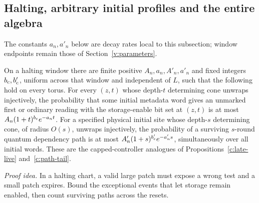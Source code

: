 \subsection{Halting, arbitrary initial profiles and the entire algebra}\label{v:forgetting}
The constants \(a_n,a'_n\) below are decay rates local to this
subsection; window endpoints remain those of Section~\ref{v:parameters}.
\begin{lemma}\label{v:ancestor}
On a halting window there are finite positive \(A_n,a_n,A'_n,a'_n\) and
fixed integers \(b_{\rm c},b'_{\rm c}\), uniform across that window and
independent of \(L\), such that the following hold on every torus. For
every \((z,t)\) whose depth-\(t\) determining cone unwraps injectively,
the probability that some initial metadata word gives an unmarked
first or ordinary reading with the storage-enable bit set at \((z,t)\) is at most
\(A_n(1+t)^{b_{\rm c}}e^{-a_nt}\). For a specified physical initial site
whose depth-\(s\) determining cone, of radius \(O(s)\), unwraps
injectively, the probability of a surviving \(s\)-round quantum dependency
path is at most \(A'_n(1+s)^{b'_{\rm c}}e^{-a'_ns}\), simultaneously over
all initial words. These are the
capped-controller analogues of Propositions~\ref{c:late-live}
and~\ref{c:path-tail}.
\end{lemma}
\par\noindent\emph{Proof idea.} In a halting chart, a valid large patch must expose a wrong test and a small patch expires. Bound the exceptional events that let storage remain enabled, then count surviving paths across the resets.


